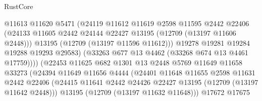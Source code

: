 \begin{lexlean}{RustCore}
\begin{coremodule}
                                    @11613
                                    @11620
                                    @5471
                                    (@24119
                                      @11612
                                      @11619
                                      @2598
                                      @11595
                                      @2442
                                      @22406
                                      (@24133
                                        @11605
                                        @2442
                                        @24144
                                        @22427
                                        @13195
                                        (@12709 (@13197 @11606 @2448)))
                                      @13195
                                      (@12709 (@13197 @11596 @11612)))
                                    @19278
                                    @19281
                                    @19284
                                    @19288
                                    @19293
                                    @29583)
                                  (@33263 @677 @13 @4462 (@33268 @674 @13 @4461 @17759))))
                              (@22453
                                @11625
                                @682
                                @1301
                                @13
                                @2448
                                @5769
                                @11649
                                @11658
                                @33273
                                (@24394
                                  @11649
                                  @11656
                                  @4444
                                  (@24401
                                    @11648
                                    @11655
                                    @2598
                                    @11631
                                    @2442
                                    @22406
                                    (@24415
                                      @11641
                                      @2442
                                      @24426
                                      @22427
                                      @13195
                                      (@12709 (@13197 @11642 @2448)))
                                    @13195
                                    (@12709 (@13197 @11632 @11648)))
                                  @17672
                                  @17675

\end{coremodule}
\end{lexlean}
